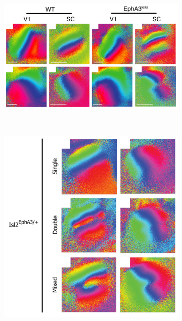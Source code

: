 \begin{figure}
	\begin{subfigure}{0.625\textwidth}
		\centering
		\includegraphics[width = \textwidth]{images/introduction/epha3hom}
		\caption{}
	\end{subfigure}
~
	\begin{subfigure}{0.375\textwidth}
		\centering
		\includegraphics[width = \textwidth]{images/introduction/epha3het}
		\caption{}
	\end{subfigure}
	\def\c{Intrinsic optical imaging scans of EphA3 knock-in mice. }

\end{figure}
